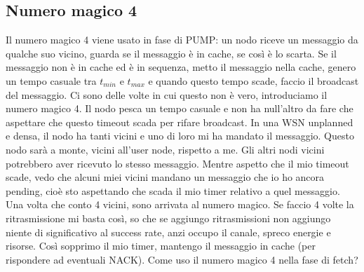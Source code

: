 \documentclass[12pt,italian]{report}
\begin{document}
\subsection{Numero magico 4}
Il numero magico 4 viene usato in fase di PUMP: un nodo riceve un messaggio da qualche suo vicino, guarda se il messaggio è in cache, se così è lo scarta. Se il messaggio non è in cache ed è in sequenza, metto il messaggio nella cache, genero un tempo casuale tra $t_{min}$ e $t_{max}$ e quando questo tempo scade, faccio il broadcast del messaggio. Ci sono delle volte in cui questo non è vero, introduciamo il numero magico 4. Il nodo pesca un tempo casuale e non ha null'altro da fare che aspettare che questo timeout scada per rifare broadcast. In una WSN unplanned e densa, il nodo ha tanti vicini e uno di loro mi ha mandato il messaggio. Questo nodo sarà a monte, vicini all'user node, rispetto a me. Gli altri nodi vicini potrebbero aver ricevuto lo stesso messaggio. Mentre aspetto che il mio timeout scade, vedo che alcuni miei vicini mandano un messaggio che io ho ancora pending, cioè sto aspettando che scada il mio timer relativo a quel messaggio. Una volta che conto 4 vicini, sono arrivata al numero magico. Se faccio 4 volte la ritrasmissione mi basta così, so che se aggiungo ritrasmissioni non aggiungo niente di significativo al success rate, anzi occupo il canale, spreco energie e risorse. Così sopprimo il mio timer, mantengo il messaggio in cache (per rispondere ad eventuali NACK). 
\bigbreak
Come uso il numero magico 4 nella fase di fetch? 
\end{document}

